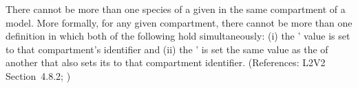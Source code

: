 There cannot be more than one species of a given \SpeciesType in the same
compartment of a model.  More formally, for any given compartment, there
cannot be more than one \Species definition in which both of the following
hold simultaneously: (i) the \Species'  value is set to
that compartment's identifier and (ii) the \Species'  is
set the same value as the  of another \Species that also
sets its  to that compartment identifier.  (References:
L2V2 Section~4.8.2; )
